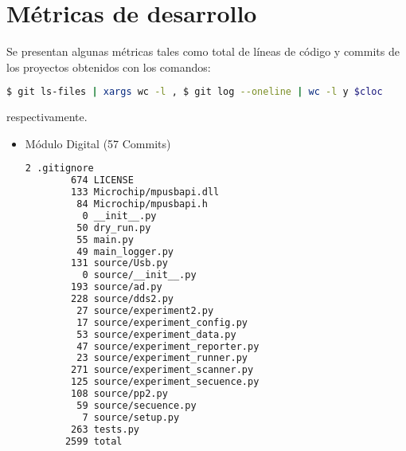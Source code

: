 \section{M\'etricas de desarrollo}

Se presentan algunas m\'etricas tales como total de l\'ineas de c\'odigo y commits de los proyectos
obtenidos con los comandos:
\begin{lstlisting}[language=bash]
    $ git ls-files | xargs wc -l , $ git log --oneline | wc -l y $cloc
\end{lstlisting}
respectivamente.
  
\begin{itemize}
\item Módulo Digital (57 Commits)
\begin{lstlisting}[language=bash]
        2 .gitignore
        674 LICENSE
        133 Microchip/mpusbapi.dll
         84 Microchip/mpusbapi.h
          0 __init__.py
         50 dry_run.py
         55 main.py
         49 main_logger.py
        131 source/Usb.py
          0 source/__init__.py
        193 source/ad.py
        228 source/dds2.py
         27 source/experiment2.py
         17 source/experiment_config.py
         53 source/experiment_data.py
         47 source/experiment_reporter.py
         23 source/experiment_runner.py
        271 source/experiment_scanner.py
        125 source/experiment_secuence.py
        108 source/pp2.py
         59 source/secuence.py
          7 source/setup.py
        263 tests.py
       2599 total
    \end{lstlisting}


\end{itemize}
